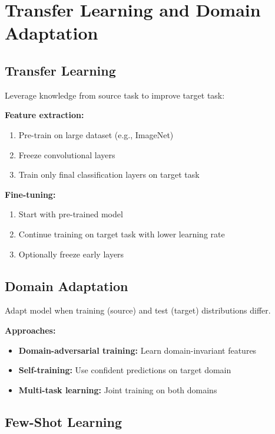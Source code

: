 
\section{Transfer Learning and Domain Adaptation}
\label{sec:transfer-learning}

\subsection{Transfer Learning}

Leverage knowledge from source task to improve target task:

\textbf{Feature extraction:}
\begin{enumerate}
    \item Pre-train on large dataset (e.g., ImageNet)
    \item Freeze convolutional layers
    \item Train only final classification layers on target task
\end{enumerate}

\textbf{Fine-tuning:}
\begin{enumerate}
    \item Start with pre-trained model
    \item Continue training on target task with lower learning rate
    \item Optionally freeze early layers
\end{enumerate}

\subsection{Domain Adaptation}

Adapt model when training (source) and test (target) distributions differ.

\textbf{Approaches:}
\begin{itemize}
    \item \textbf{Domain-adversarial training:} Learn domain-invariant features
    \item \textbf{Self-training:} Use confident predictions on target domain
    \item \textbf{Multi-task learning:} Joint training on both domains
\end{itemize}

\subsection{Few-Shot Learning}

